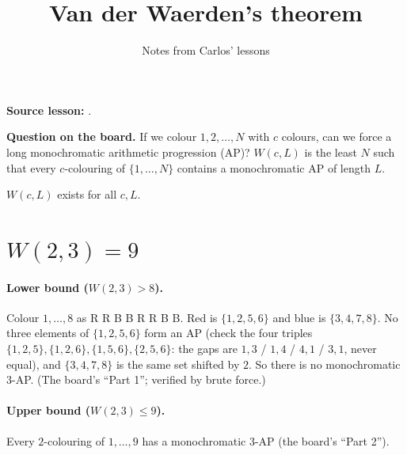 \documentclass[11pt]{article}
\title{Van der Waerden's theorem}
\author{Notes from Carlos' lessons}
\date{}
\begin{document}
\maketitle

\textbf{Source lesson:} .

\medskip
\textbf{Question on the board.} If we colour $1,2,\dots,N$ with $c$ colours, can we force a long monochromatic arithmetic progression (AP)? $W(c,L)$ is the least $N$ such that every $c$-colouring of $\{1,\dots,N\}$ contains a monochromatic AP of length $L$.

\begin{theorem}
$W(c,L)$ exists for all $c,L$.
\end{theorem}

\section{$W(2,3)=9$}

\paragraph{Lower bound ($W(2,3)>8$).} Colour $1,\dots,8$ as R R B B R R B B. Red is $\{1,2,5,6\}$ and blue is $\{3,4,7,8\}$. No three elements of $\{1,2,5,6\}$ form an AP (check the four triples $\{1,2,5\},\{1,2,6\},\{1,5,6\},\{2,5,6\}$: the gaps are $1,3$ / $1,4$ / $4,1$ / $3,1$, never equal), and $\{3,4,7,8\}$ is the same set shifted by $2$. So there is no monochromatic $3$-AP. (The board's ``Part 1''; verified by brute force.)

\paragraph{Upper bound ($W(2,3)\le9$).} Every $2$-colouring of $1,\dots,9$ has a monochromatic $3$-AP (the board's ``Part 2'').
\end{document}
